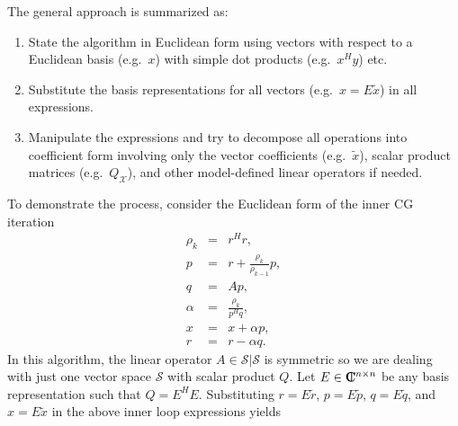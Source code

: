 \documentclass[pdf,ps2pdf,11pt]{SANDreport}
\begin{document}
The general approach is summarized as:
%
\begin{enumerate}
%
{}\item State the algorithm in Euclidean form using vectors with respect to a
Euclidean basis (e.g.\ $x$) with simple dot products (e.g.\ $x^H y$) etc.
%
{}\item Substitute the basis representations for all vectors (e.g.\ $x = E
{}\tilde{x}$) in all expressions.
%
{}\item Manipulate the expressions and try to decompose all operations into
coefficient form involving only the vector coefficients (e.g.\ $\tilde{x}$),
scalar product matrices (e.g.\ $Q_{\mathcal{X}}$), and other model-defined
linear operators if needed.
%
\end{enumerate}
%
To demonstrate the process, consider the Euclidean form of the inner CG
iteration
%
\begin{eqnarray*}
\rho_k & = & r^H r, \\
p & = & r + \frac{\rho_k}{\rho_{k-1}} p, \\
q & = & A p, \\
\alpha & = & \frac{\rho_k}{p^H q}, \\
x & = & x + \alpha p, \\
r & = & r - \alpha q.
\end{eqnarray*}
%
In this algorithm, the linear operator $A\in\mathcal{S}|\mathcal{S}$ is
symmetric so we are dealing with just one vector space $\mathcal{S}$ with
scalar product $Q$.  Let $E\in\mbox{\textbf{C}}\hspace{-1.1ex}\mbox{l}\hspace{0.4ex}^{n\times{}n}$ be any basis representation
such that $Q=E^H E$.  Substituting $r=E\tilde{r}$, $p=E\tilde{p}$,
$q=E\tilde{q}$, and $x=E\tilde{x}$ in the above inner loop expressions yields
%
\end{document}
